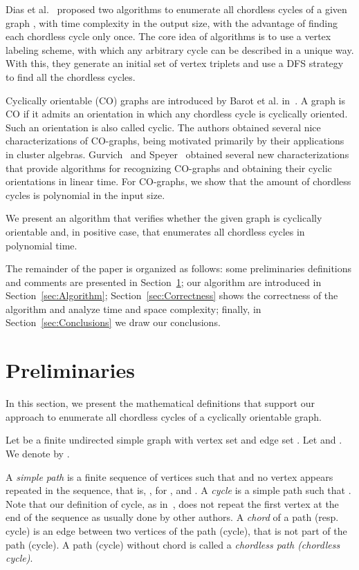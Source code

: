 \documentclass{lawcg}
\begin{document}
Dias et al.~\cite{DCLJ2014} proposed two algorithms to enumerate all chordless cycles of a given graph , with  time complexity in the output size, with the advantage of finding each chordless cycle only once. The core idea of algorithms is to use a vertex labeling scheme, with which any arbitrary cycle can be described in a unique way. With this, they generate an initial set of vertex triplets and use a DFS strategy to find all the chordless cycles. 

Cyclically orientable (CO) graphs are introduced by Barot et al. in~\cite{BGZ2006}. A graph  is CO if it admits an orientation in which any chordless cycle is cyclically oriented. Such an orientation is also called cyclic. The authors obtained several nice characterizations of CO-graphs, being motivated primarily by their applications in cluster algebras. Gurvich~\cite{G2008} and Speyer~\cite{S2005} obtained several new characterizations that provide algorithms for recognizing CO-graphs and obtaining their cyclic orientations in linear time. For CO-graphs, we show that the amount of chordless cycles is polynomial in the input size.

We present an algorithm that verifies whether the given graph is cyclically orientable and, in positive case, that enumerates all chordless cycles in polynomial time.

The remainder of the paper is organized as follows: some preliminaries definitions and comments are presented in Section~\ref{sec:Preliminaries}; our algorithm are introduced in Section~\ref{sec:Algorithm}; Section~\ref{sec:Correctness} shows the correctness of the algorithm and analyze time and space complexity; finally, in Section~\ref{sec:Conclusions} we draw our conclusions.

\section{Preliminaries}
\label{sec:Preliminaries}

In this section, we present the mathematical definitions that support our approach to enumerate all chordless cycles of a cyclically orientable graph.

Let  be a finite undirected simple graph with vertex set  and edge set . Let  and . We denote by .

A \textit{simple path} is a finite sequence of vertices  such that  and no vertex appears repeated in the sequence, that is,  , for ,  and . A \textit{cycle} is a simple path  such that . Note that our definition of cycle, as in~\cite{DCLJ2014}, does not repeat the first vertex at the end of the sequence as usually done by other authors. A {\it chord} of a path (resp. cycle) is an edge between two vertices of the path (cycle), that is not part of the path (cycle). A path (cycle) without chord is called a {\it chordless path (chordless cycle)}.
\end{document}
